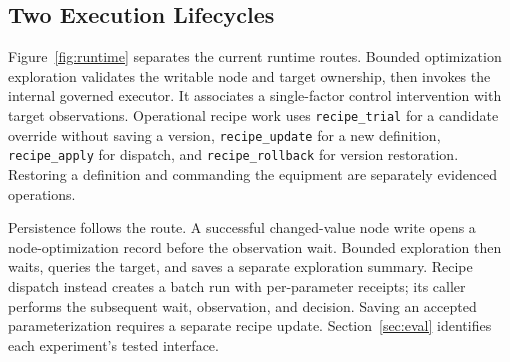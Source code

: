 \subsection{Two Execution Lifecycles}
\label{sec:tasklifecycle}
Figure~\ref{fig:runtime} separates the current runtime routes. Bounded
optimization exploration validates the writable node and target ownership,
then invokes the internal governed executor. It associates a single-factor
control intervention with target observations. Operational recipe work
uses \texttt{recipe\_trial} for a candidate override without saving a
version, \texttt{recipe\_update} for a new definition,
\texttt{recipe\_apply} for dispatch, and \texttt{recipe\_rollback} for
version restoration. Restoring a definition and commanding the equipment
are separately evidenced operations.

Persistence follows the route. A successful changed-value node write opens
a node-optimization record before the observation wait. Bounded exploration
then waits, queries the target, and saves a separate exploration summary.
Recipe dispatch instead creates a batch run with per-parameter receipts;
its caller performs the subsequent wait, observation, and decision. Saving
an accepted parameterization requires a separate recipe update.
Section~\ref{sec:eval} identifies each experiment's tested interface.
